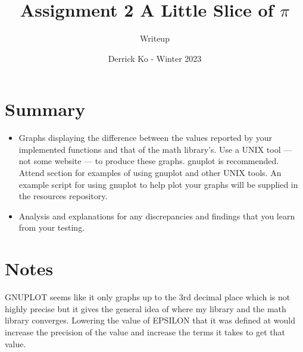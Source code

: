 \documentclass{article}
\title{\Large \textbf Assignment 2 A Little Slice of $\pi$}
\author{Writeup}
\date{Derrick Ko - Winter 2023}
\begin{document}
\maketitle
\section{Summary}
\begin{itemize}
\item Graphs displaying the difference between the values reported by your implemented functions and that
of the math library’s. Use a UNIX tool — not some website — to produce these graphs. gnuplot is
recommended. Attend section for examples of using gnuplot and other UNIX tools. An example script
for using gnuplot to help plot your graphs will be supplied in the resources repository.
\item Analysis and explanations for any discrepancies and findings that you learn from your testing.
\end{itemize}
\section{Notes}
GNUPLOT seems like it only graphs up to the 3rd decimal place which is not highly precise but it gives the general idea of where my library and the math library converges. Lowering the value of EPSILON that it was defined at would increase the precision of the value and increase the terms it takes to get that value.
\end{document}
